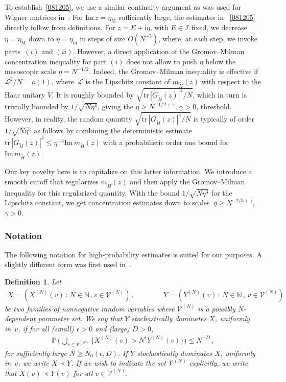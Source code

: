 \documentclass[10pt,reqno]{amsart}
\numberwithin{equation}{section}
\theoremstyle{plain}
\newtheorem{definition}[theorem]{Definition}
\numberwithin{kevin}{section}
\theoremstyle{remark}
\renewcommand{\Im}{\mathrm{Im}\,}
\newcommand{\im}{\mathrm{Im}\,}
\newcommand{\N}{{\mathbb N}}
\renewcommand{\P}{{\mathbb P}}
\newcommand{\ii}{\mathrm{i}}
\newcommand{\ntr}{\mathrm{tr}\,}
\begin{document}
To establish~\eqref{081205}, we use a similar continuity argument as was used for Wigner matrices in~\cite{EYY}: For $\im z=\eta_{\mathrm{M}}$ sufficiently large, the estimates in ~\eqref{081205} directly follow from definitions. For $z=E+\ii\eta$, with $E\in \mathcal{I}$ fixed, we decrease $\eta=\eta_{\mathrm{M}}$ down to $\eta=\eta_{\mathrm{m}}$ in steps of size $O(N^{-5})$, where, at each step, we invoke parts~$(i)$ and $(ii)$. However, a direct application of the  Gromov--Milman concentration inequality for part $(i)$ does not allow to push $\eta$ below the mesoscopic scale $\eta= N^{ -1/2}$. Indeed, the Gromov--Milman inequality is effective if $\mathcal{L}^{2}/N=o(1)$, where~$\mathcal{L}$ is the Lipschitz constant of $m_{{\widetilde H}}(z)$ with respect to the Haar unitary $V$. It is roughly bounded by $\sqrt{\ntr |G_{\widetilde H}(z)|^4/N}$, which in turn is trivially bounded by $1/\sqrt{N\eta^4}$, giving the $\eta\ge N^{-1/2+\gamma}$, $\gamma>0$, threshold. However, in reality, the random quantity
$\sqrt{\ntr |G_{\widetilde H}(z)|^4/N}$ is typically of order $1/\sqrt{N\eta^3}$ as follows by combining the deterministic estimate $\ntr |G_{\widetilde H}(z)|^4\leq  \eta^{-3}\Im m_{\widetilde H}(z)$ with a probabilistic order one bound for~$\im m_{\widetilde H}(z)$. 

Our key novelty here is to capitalize on this latter information. We introduce a smooth cutoff that regularizes $m_{\widetilde H}(z)$ and then apply the Gromov--Milman inequality for this regularized quantity. With the bound  $1/\sqrt{N\eta^3}$ for the Lipschitz constant, we get concentration estimates down to scales~$\eta\ge N^{-2/3+\gamma}$, $\gamma>0$. 

\subsubsection{Notation}
The following notation for high-probability estimates is suited for our purposes. A slightly different form was first used in~\cite{EKY}.
\begin{definition}\label{definition of stochastic domination}
Let
\begin{align}
 X=(X^{(N)}(v)\,:\, N\in\N\,, v\in \mathcal{V}^{(N)})\,,\qquad\qquad Y=(Y^{(N)}(v)\,:\, N\in\N\,,\,v\in \mathcal{V}^{(N)})
\end{align}
be two families of nonnegative random variables where $\mathcal{V}^{(N)}$ is a possibly $N$-dependent parameter set. We say that $Y$ stochastically dominates $X$, uniformly in~$v$, if for all (small) $\epsilon>0$ and (large) $D>0$,
\begin{align}
 \P\,\bigg(\bigcup_{v\in \mathcal{V}^{(N)}}\bigg\{X^{(N)}(v)>N^{\epsilon} Y^{(N)}(v) \bigg\}\bigg)\le N^{-D}\,, \label{080630}
\end{align}
for sufficiently large $N\ge N_0(\epsilon,D)$. If $Y$ stochastically dominates $X$, uniformly in~$v$, we write $X \prec Y$. 
If we wish to indicate the set $\mathcal{V}^{(N)}$ explicitly, we write that
$X(v) \prec Y(v)$ for all $v\in \mathcal{V}^{(N)}$.
\end{definition}
\end{document}
